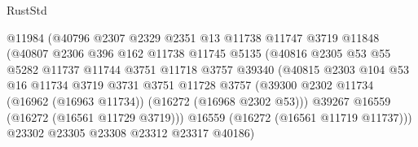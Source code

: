\begin{lexlean}{RustStd}
\begin{coremodule}
                                  @11984
                                  (@40796
                                    @2307
                                    @2329
                                    @2351
                                    @13
                                    @11738
                                    @11747
                                    @3719
                                    @11848
                                    (@40807
                                      @2306
                                      @396
                                      @162
                                      @11738
                                      @11745
                                      @5135
                                      (@40816
                                        @2305
                                        @53
                                        @55
                                        @5282
                                        @11737
                                        @11744
                                        @3751
                                        @11718
                                        @3757
                                        @39340
                                        (@40815
                                          @2303
                                          @104
                                          @53
                                          @16
                                          @11734
                                          @3719
                                          @3731
                                          @3751
                                          @11728
                                          @3757
                                          (@39300
                                            @2302
                                            @11734
                                            (@16962 (@16963 @11734))
                                            (@16272 (@16968 @2302 @53)))
                                          @39267
                                          @16559
                                          (@16272 (@16561 @11729 @3719)))
                                        @16559
                                        (@16272 (@16561 @11719 @11737)))
                                      @23302
                                      @23305
                                      @23308
                                      @23312
                                      @23317
                                      @40186)

\end{coremodule}
\end{lexlean}

